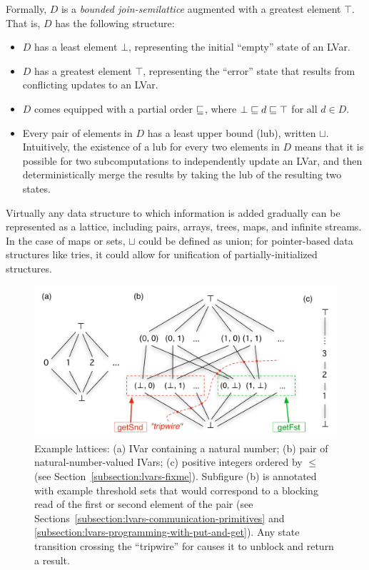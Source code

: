 Formally, $D$ is a \emph{bounded join-semilattice} augmented with a
greatest element $\top$.  That is, $D$ has the following structure:
\begin{itemize}
\item $D$ has a least element $\bot$, representing the initial
  ``empty'' state of an LVar.
\item $D$ has a greatest element $\top$, representing the ``error''
  state that results from conflicting updates to an LVar.
\item $D$ comes equipped with a partial order $\sqsubseteq$, where $\bot
  \sqsubseteq d \sqsubseteq \top$ for all $d \in D$.
\item Every pair of elements in $D$ has a least upper bound (lub),
  written $\sqcup$.  Intuitively, the existence of a lub for every two
  elements in $D$ means that it is possible for two subcomputations to
  independently update an LVar, and then deterministically merge the
  results by taking the lub of the resulting two states.
\end{itemize}

Virtually any data structure to which information is added gradually
can be represented as a lattice, including pairs, arrays, trees, maps,
and infinite streams.  In the case of maps or sets, $\sqcup$ could be
defined as union; for pointer-based data structures like tries, it
could allow for unification of partially-initialized structures.

\begin{figure}
\includegraphics[width=5in]{chapter2/figures/ExampleLattices2.pdf} 
  \caption{Example lattices: (a) IVar containing a natural number; (b)
    pair of natural-number-valued IVars; (c) positive integers ordered
    by $\leq$ (see Section~\ref{subsection:lvars-fixme}).  Subfigure
    (b) is annotated with example threshold sets that would correspond
    to a blocking read of the first or second element of the pair (see
    Sections~\ref{subsection:lvars-communication-primitives} and
    \ref{subsection:lvars-programming-with-put-and-get}).  Any state
    transition crossing the ``tripwire'' for  causes
    it to unblock and return a result.}
    \label{f:lvars-example-lattices}
\end{figure}

